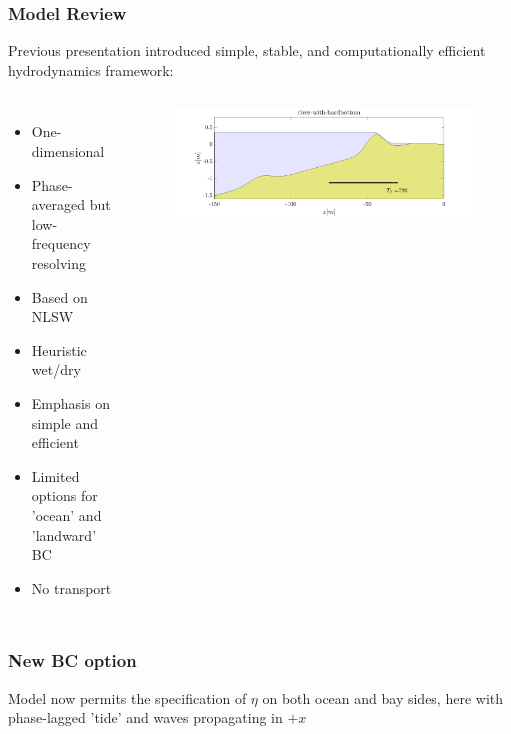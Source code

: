 \documentclass[aspectratio=169]{beamer}
\begin{document}
\begin{frame}
  \frametitle{Model Review}
Previous presentation introduced simple, stable, and computationally efficient hydrodynamics framework:
 \begin{columns}[c] %
    

 \begin{itemize}
 \item One-dimensional
 \item Phase-averaged but low-frequency resolving
 \item Based on NLSW 
 \item Heuristic wet/dry
 \item Emphasis on simple and efficient
 \item Limited options for 'ocean' and 'landward' BC
 \item No transport 
   \end{itemize}
    \begin{figure}
      \includegraphics[width=1\linewidth]{./present.png}
    \end{figure}

 \end{columns}
 \end{frame}
\begin{frame}
  \frametitle{New BC option}
  Model now permits the specification of $\eta$ on both ocean and bay sides, here with phase-lagged 'tide' and waves propagating in $+x$
\end{frame}
\end{document}
